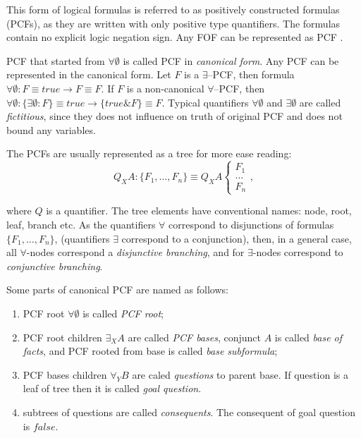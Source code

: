 \documentclass[runningheads,a4paper]{llncs}
\begin{document}
This form of logical formulas is referred to as positively constructed formulas (PCFs), as they are written with only positive type quantifiers. The formulas contain no explicit logic negation sign. Any FOF can be represented as PCF \cite{ICDS2000}.

PCF that started from $\forall \emptyset$ is called PCF in {\em canonical form}. Any PCF can be represented in the canonical form. Let $F$ is a $\exists$--PCF, then formula
$\forall \emptyset\colon F \equiv true \rightarrow F \equiv F$. If $F$ is a non-canonical $\forall$--PCF, then $\forall \emptyset\colon\{\exists \emptyset\colon F\} \equiv true \rightarrow \{true\&F\} \equiv F$. Typical quantifiers $\forall \emptyset$ and $\exists \emptyset$ are called {\em fictitious}, since they does not influence on truth of original PCF and does not bound any variables.  %

The PCFs are usually represented as a tree for more ease reading:
$$Q_XA\colon\{F_1,\ldots,F_n\} \equiv Q_XA \left\{
\begin{array}{lcl}
 F_1 \\
 \ldots \\
 F_n
\end{array}
\right.,$$

\noindent{} where $Q$ is a quantifier. The tree elements have conventional names: node, root, leaf, branch etc. As the quantifiers $\forall$ correspond to disjunctions of formulas $\{F_1,\ldots,F_n\}$, (quantifiers $\exists$ correspond to a conjunction), then, in a general case, all $\forall$-nodes correspond a {\em disjunctive branching}, and for $\exists$-nodes correspond to {\em conjunctive branching}.

Some parts of canonical PCF are named as follows:
\begin{enumerate}
\item PCF root $\forall \emptyset$ is called {\em PCF root};
\item PCF root children $\exists_XA$ are called {\em PCF bases}, conjunct $A$ is called {\em base of facts}, and PCF rooted from base is called {\em base subformula};
\item PCF bases children $\forall_YB$ are caled {\em questions} to parent base. If question is a leaf of tree then it is called {\em goal question}.
\item subtrees of questions are called {\em consequents}. The consequent of goal question is $false$.
\end{enumerate}
\end{document}

